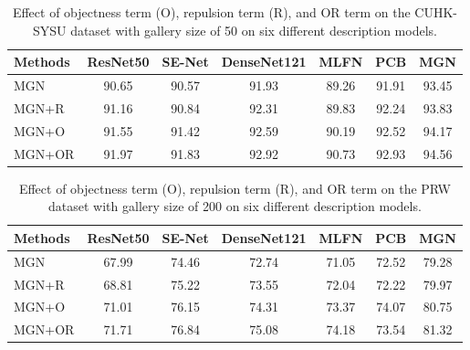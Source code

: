 \documentclass[journal]{IEEEtran}
\begin{document}
\begin{table*}
\begin{center}
\caption{Effect of objectness term (O), repulsion term (R), and OR term on the CUHK-SYSU dataset with gallery size of 50 on six different description models.}
\label{Tab:effect_om}
\begin{tabular}{lcccccc}
\hline
Methods & ResNet50 & SE-Net & DenseNet121 & MLFN & PCB & MGN\\
\hline
\hline
MGN& 90.65 & 90.57 & 91.93 & 89.26& 91.91 & 93.45\\
MGN+R &91.16 &90.84& 92.31 & 89.83 & 92.24 & 93.83\\
MGN+O & 91.55& 91.42 & 92.59 & 90.19 & 92.52 & 94.17\\
MGN+OR & 91.97 & 91.83 & 92.92 & 90.73 & 92.93 & 94.56\\
\hline
\end{tabular}
\end{center}
\end{table*}

\begin{table*}
\begin{center}
\caption{Effect of objectness term (O), repulsion term (R), and OR term on the PRW dataset with gallery size of 200 on six different description models.}
\label{Tab:effect_om_prw}
\begin{tabular}{lcccccc}
\hline
Methods & ResNet50 & SE-Net & DenseNet121 & MLFN & PCB & MGN\\
\hline
\hline
MGN& 67.99 & 74.46 & 72.74 & 71.05& 72.52 & 79.28\\
MGN+R &68.81&75.22& 73.55 & 72.04 & 72.22 & 79.97\\
MGN+O & 71.01& 76.15 & 74.31 & 73.37 & 74.07 & 80.75\\
MGN+OR & 71.71& 76.84 & 75.08 & 74.18 & 73.54 & 81.32\\
\hline
\end{tabular}
\end{center}
\end{table*}
\end{document}
